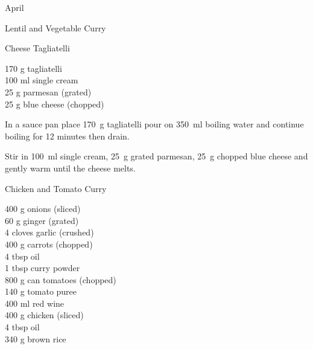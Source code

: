 \begin{menu}{April}
\begin{recipe}{2}{Lentil and Vegetable Curry}
\begin{instructions}
    \end{instructions}
    \end{recipe}%
  
    \begin{recipe}{1}{Cheese Tagliatelli}%
		\begin{ingredients}
		170 g tagliatelli  \\
	100 ml single cream  \\
	25 g parmesan (grated) \\
	25 g blue cheese (chopped) \\
	
		\end{ingredients}
	
	
	
    \begin{instructions}
    \item 
    In a
    sauce pan
    place
    170~g  tagliatelli
    pour on
    350~ml  boiling water
    and continue boiling for 12 minutes then drain.
  \item 
        Stir in
        100~ml  single cream,
        25~g grated parmesan,
        25~g chopped blue cheese
        and gently warm until the cheese melts.
      
    \end{instructions}
    \end{recipe}%
  
    \begin{recipe}{2}{Chicken and Tomato Curry}%
		\begin{ingredients}
		400 g onions (sliced) \\
	60 g ginger (grated) \\
	4 cloves garlic (crushed) \\
	400 g carrots (chopped) \\
	4 tbsp oil  \\
	1 tbsp curry powder  \\
	800 g can tomatoes (chopped) \\
	140 g tomato puree  \\
	400 ml red wine  \\
	400 g chicken (sliced) \\
	4 tbsp oil  \\
	340 g brown rice  \\
	
		\end{ingredients}
	

\end{recipe}
\end{menu}

